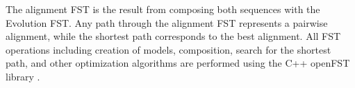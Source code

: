 The alignment FST is the result from composing both sequences with the Evolution
FST.
Any path through the alignment FST represents a pairwise alignment, while the
shortest path corresponds to the best alignment.
All FST operations including creation of models, composition, search for the
shortest path, and other optimization algorithms are performed using the C++
openFST library \parencite{allauzen2007openfst}.


